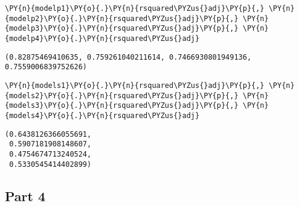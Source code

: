     \begin{tcolorbox}[breakable, size=fbox, boxrule=1pt, pad at break*=1mm,colback=cellbackground, colframe=cellborder]
\begin{Verbatim}[commandchars=\\\{\}]
\PY{n}{modelp1}\PY{o}{.}\PY{n}{rsquared\PYZus{}adj}\PY{p}{,} \PY{n}{modelp2}\PY{o}{.}\PY{n}{rsquared\PYZus{}adj}\PY{p}{,} \PY{n}{modelp3}\PY{o}{.}\PY{n}{rsquared\PYZus{}adj}\PY{p}{,} \PY{n}{modelp4}\PY{o}{.}\PY{n}{rsquared\PYZus{}adj}
\end{Verbatim}
\end{tcolorbox}

            \begin{tcolorbox}[breakable, size=fbox, boxrule=.5pt, pad at break*=1mm, opacityfill=0]
\begin{Verbatim}[commandchars=\\\{\}]
(0.82875469410635, 0.759261040211614, 0.7466930801949136, 0.7559006839752626)
\end{Verbatim}
\end{tcolorbox}

    \begin{tcolorbox}[breakable, size=fbox, boxrule=1pt, pad at break*=1mm,colback=cellbackground, colframe=cellborder]
\begin{Verbatim}[commandchars=\\\{\}]
\PY{n}{models1}\PY{o}{.}\PY{n}{rsquared\PYZus{}adj}\PY{p}{,} \PY{n}{models2}\PY{o}{.}\PY{n}{rsquared\PYZus{}adj}\PY{p}{,} \PY{n}{models3}\PY{o}{.}\PY{n}{rsquared\PYZus{}adj}\PY{p}{,} \PY{n}{models4}\PY{o}{.}\PY{n}{rsquared\PYZus{}adj}
\end{Verbatim}
\end{tcolorbox}

            \begin{tcolorbox}[breakable, size=fbox, boxrule=.5pt, pad at break*=1mm, opacityfill=0]
\begin{Verbatim}[commandchars=\\\{\}]
(0.6438126366055691,
 0.5907181908148607,
 0.4754674713240524,
 0.5330545414402899)
\end{Verbatim}
\end{tcolorbox}

    \hypertarget{part-4}{%
\subsection{Part 4}\label{part-4}}


